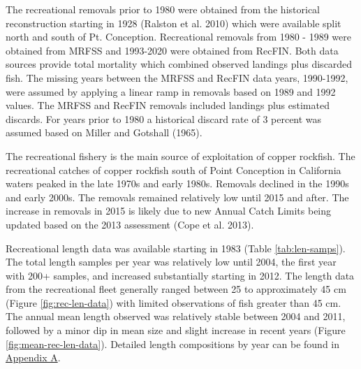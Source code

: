\documentclass[11pt,
  english,
  a4paper,
]{article}
\begin{document}

The recreational removals prior to 1980 were obtained from the historical reconstruction starting in 1928 {(Ralston et al. 2010)\leavevmode\tagmcend\tagstructend} which were available split north and south of Pt. Conception. Recreational removals from 1980 - 1989 were obtained from MRFSS and 1993-2020 were obtained from RecFIN. Both data sources provide total mortality which combined observed landings plus discarded fish. The missing years between the MRFSS and RecFIN data years, 1990-1992, were assumed by applying a linear ramp in removals based on 1989 and 1992 values. The MRFSS and RecFIN removals included landings plus estimated discards. For years prior to 1980 a historical discard rate of 3 percent was assumed based on Miller and Gotshall {(1965)\leavevmode\tagmcend\tagstructend}.

\leavevmode\tagmcend\tagstructend\par


The recreational fishery is the main source of exploitation of copper rockfish. The recreational catches of copper rockfish south of Point Conception in California waters peaked in the late 1970s and early 1980s. Removals declined in the 1990s and early 2000s. The removals remained relatively low until 2015 and after. The increase in removals in 2015 is likely due to new Annual Catch Limits being updated based on the 2013 assessment {(Cope et al. 2013)\leavevmode\tagmcend\tagstructend}.

\leavevmode\tagmcend\tagstructend\par


Recreational length data was available starting in 1983 (Table \ref{tab:len-samps}). The total length samples per year was relatively low until 2004, the first year with 200+ samples, and increased substantially starting in 2012. The length data from the recreational fleet generally ranged between 25 to approximately 45 cm\\
(Figure \ref{fig:rec-len-data}) with limited observations of fish greater than 45 cm. The annual mean length observed was relatively stable between 2004 and 2011, followed by a minor dip in mean size and slight increase in recent years (Figure \ref{fig:mean-rec-len-data}). Detailed length compositions by year can be found in {\protect\hyperlink{append_a}{Appendix A}\leavevmode\tagmcend\tagstructend}.
\end{document}
